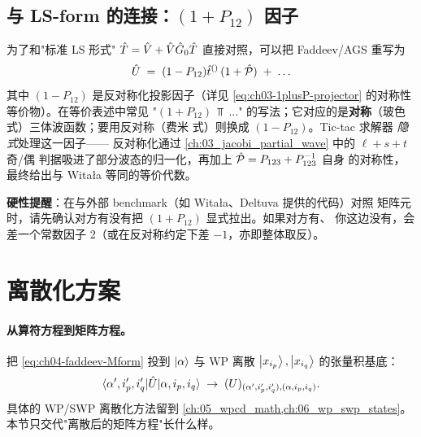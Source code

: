 \subsection{与 LS-form 的连接：\((1 + P_{12})\) 因子}
\label{subsec:ch04-LS-connect}

为了和"标准 LS 形式" \(\hat{T} = \hat{V} + \hat{V} \hat{G}_0 \hat{T}\) 直接对照，可以把
Faddeev/AGS 重写为
\begin{equation}
\label{eq:ch04-LS-link}
\hat{U} \;=\; (1 - P_{12}) \hat{t}^{()}\,(1 + \hat{\mathcal{P}}) \;+\; \ldots
\end{equation}
其中 \((1 - P_{12})\) 是反对称化投影因子（详见 \cref{eq:ch03-1plusP-projector}
的对称性等价物）。在等价表述中常见 "\((1 + P_{12})\,\Top\,\ldots\)"
的写法；它对应的是\textbf{对称}（玻色式）三体波函数；要用反对称（费米
式）则换成 \((1 - P_{12})\)。Tic-tac 求解器 \emph{隐式}处理这一因子——
反对称化通过 \cref{ch:03_jacobi_partial_wave} 中的 \(\ell + s + t\) 奇/偶
判据吸进了部分波态的归一化，再加上 \(\hat{\mathcal{P}} = P_{123} + P_{123}^{-1}\) 自身
的对称性，最终给出与 Witała 等同的等价代数。

\textbf{硬性提醒}：在与外部 benchmark（如 Witała、Deltuva 提供的代码）对照
矩阵元时，请先确认对方有没有把 \((1 + P_{12})\) 显式拉出。如果对方有、
你这边没有，会差一个常数因子 2（或在反对称约定下差 \(-1\)，亦即整体取反）。

\section{离散化方案}
\label{sec:ch04-discretization}

\paragraph{从算符方程到矩阵方程。}
把 \cref{eq:ch04-faddeev-Mform} 投到 \(\ket{\alpha}\) 与 WP 离散
\(\ket{x_{i_p}}, \ket{x_{i_q}}\) 的张量积基底：
\begin{equation}
\langle \alpha', i_p', i_q' | \hat{U} | \alpha, i_p, i_q \rangle
\;\to\; (U)_{(\alpha', i_p', i_q'),(\alpha, i_p, i_q)}.
\end{equation}
具体的 WP/SWP 离散化方法留到 \cref{ch:05_wpcd_math,ch:06_wp_swp_states}。
本节只交代"离散后的矩阵方程"长什么样。


